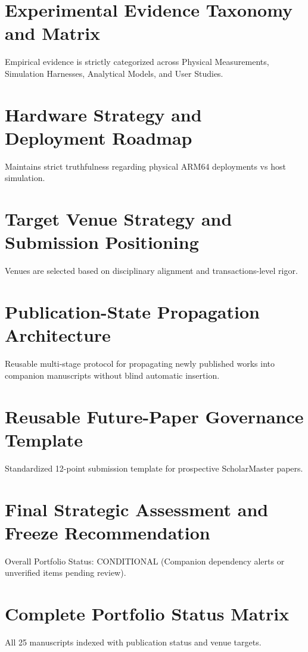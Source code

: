 \documentclass[11pt,a4paper]{article}
\begin{document}
\section{Experimental Evidence Taxonomy and Matrix}
Empirical evidence is strictly categorized across Physical Measurements, Simulation Harnesses, Analytical Models, and User Studies.

\section{Hardware Strategy and Deployment Roadmap}
Maintains strict truthfulness regarding physical ARM64 deployments vs host simulation.

\section{Target Venue Strategy and Submission Positioning}
Venues are selected based on disciplinary alignment and transactions-level rigor.

\section{Publication-State Propagation Architecture}
Reusable multi-stage protocol for propagating newly published works into companion manuscripts without blind automatic insertion.

\section{Reusable Future-Paper Governance Template}
Standardized 12-point submission template for prospective ScholarMaster papers.

\section{Final Strategic Assessment and Freeze Recommendation}
Overall Portfolio Status: CONDITIONAL (Companion dependency alerts or unverified items pending review).

\newpage
\appendix
\section{Complete Portfolio Status Matrix}
All 25 manuscripts indexed with publication status and venue targets.
\end{document}
